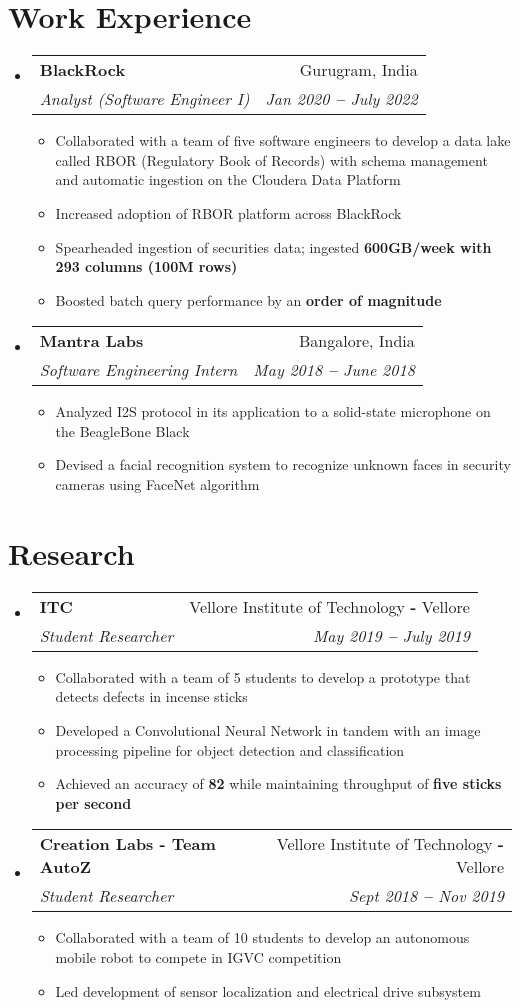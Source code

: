 \documentclass[12pt]{article}
\makeatletter
\newcommand{\resumeItem}[1]{
  \item\small{
    {#1}
  } 
  \vspace{-3pt}
}
\newcommand{\resumeSubheading}[4]{
  \item
    \begin{tabular*}{0.97\textwidth}[t]{l@{\extracolsep{\fill}}r}
      \textbf{\small#1} & \small#2 \\
      \textit{\small#3} & \textit{\small #4} \\
    \end{tabular*}
}
\newcommand{\resumeSubHeadingListStart}{\begin{itemize}[leftmargin=0.15in, label={}]}
\newcommand{\resumeSubHeadingListEnd}{\end{itemize}}
\newcommand{\resumeItemListStart}{\begin{itemize}\vspace{-8pt}}
\newcommand{\resumeItemListEnd}{\end{itemize}\vspace{-8pt}}
\makeatother
\begin{document}
\section{Work Experience}
  \resumeSubHeadingListStart
  \resumeSubheading
      {BlackRock}{Gurugram, India}
      {Analyst (Software Engineer I)}{Jan 2020 \textbf{--} July 2022}
        \resumeItemListStart
            \resumeItem{Collaborated with a team of five software engineers to develop a data lake called RBOR (Regulatory Book of Records) with schema management and automatic ingestion on the Cloudera Data Platform}
            \resumeItem{Increased adoption of RBOR platform across BlackRock}
            \resumeItem{Spearheaded ingestion of securities data; ingested \textbf{600GB/week with 293 columns (100M rows)}}
            \resumeItem{Boosted batch query performance by an \textbf{order of magnitude}}  
        \resumeItemListEnd 
      \resumeSubheading
        {Mantra Labs}{Bangalore, India}
        {Software Engineering Intern}{May 2018 \textbf{--} June 2018}
          \resumeItemListStart
              \resumeItem{Analyzed I2S protocol in its application to a solid-state microphone on the BeagleBone Black}
              \resumeItem{Devised a facial recognition system to recognize unknown faces in security cameras using FaceNet algorithm}
          \resumeItemListEnd 
    \resumeSubHeadingListEnd
    \vspace{0pt}

\section{Research}
  \resumeSubHeadingListStart
    \resumeSubheading
      {ITC}{ Vellore Institute of Technology  \textbf{-} Vellore}
      {Student Researcher}{May 2019 \textbf{--}  July 2019}
        \resumeItemListStart
            \resumeItem{Collaborated with a team of 5 students to develop a prototype that detects defects in incense sticks}
            \resumeItem{Developed a Convolutional Neural Network in tandem with an image processing pipeline for object detection and classification}
            \resumeItem{Achieved an accuracy of \textbf{82\symbol{\%}} while maintaining throughput of \textbf{five sticks per second}}
            \resumeItemListEnd
    \resumeSubheading
      {Creation Labs - Team AutoZ}{Vellore Institute of Technology \textbf{-} Vellore}
      {Student Researcher}{Sept 2018 \textbf{--}  Nov 2019}
        \resumeItemListStart
            \resumeItem{Collaborated with a team of 10 students to develop an autonomous mobile robot to compete in IGVC competition}
            \resumeItem{Led development of sensor localization and electrical drive subsystem}
            \resumeItemListEnd
  \resumeSubHeadingListEnd
    \vspace{0pt}
\end{document}
